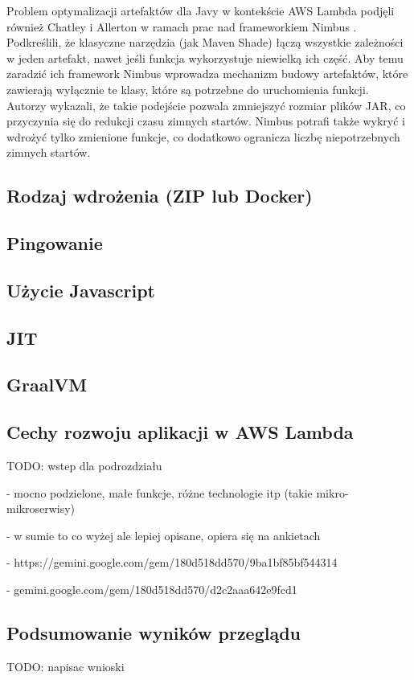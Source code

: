 Problem optymalizacji artefaktów dla Javy w kontekście AWS Lambda podjęli również Chatley i Allerton w ramach prac nad frameworkiem Nimbus \cite{10.1145/3377812.3382135}.
Podkreślili, że klasyczne narzędzia (jak Maven Shade) łączą wszystkie zależności w jeden artefakt, nawet jeśli funkcja wykorzystuje niewielką ich część.
Aby temu zaradzić ich framework Nimbus wprowadza mechanizm budowy artefaktów, które zawierają wyłącznie te klasy, które są potrzebne do uruchomienia funkcji.
Autorzy wykazali, że takie podejście pozwala zmniejszyć rozmiar plików JAR, co przyczynia się do redukcji czasu zimnych startów. 
Nimbus potrafi także wykryć i wdrożyć tylko zmienione funkcje, co dodatkowo ogranicza liczbę niepotrzebnych zimnych startów.

\subsection*{Rodzaj wdrożenia (ZIP lub Docker)}
\cite{9860368}

\subsection*{Pingowanie}
\cite{8605779}

\subsection*{Użycie Javascript}
\cite{8844428}
\cite{FerreiraDosSantos2023}

\subsection*{JIT}
\cite{10.1145/3458336.3465305}

\subsection*{GraalVM}
\cite{menéndez2023performancebestpracticesusing}
\cite{ritzal2020optimizing}

\subsection{Cechy rozwoju aplikacji w AWS Lambda}\label{chapter:przeglad_literatury_wyniki_cechy_rozwoju}

TODO: wstep dla podrozdziału

\cite{9095731} - mocno podzielone, małe funkcje, różne technologie itp (takie mikro-mikroserwisy)

\cite{9912641} - w sumie to co wyżej ale lepiej opisane, opiera się na ankietach

\cite{8605774} - https://gemini.google.com/gem/180d518dd570/9ba1bf85bf544314

\cite{10.1145/3377812.3382135} - gemini.google.com/gem/180d518dd570/d2c2aaa642e9fcd1

\subsection{Podsumowanie wyników przeglądu}\label{chapter:przeglad_literatury_wyniki_podsumowanie}

TODO: napisac wnioski
